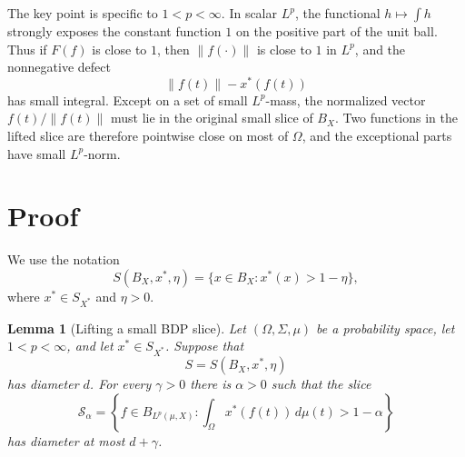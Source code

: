 \documentclass[11pt]{article}
\newtheorem{lemma}{Lemma}
\begin{document}
The key point is specific to \(1<p<\infty\).  In scalar \(L^p\), the functional \(h\mapsto\int h\) strongly exposes the constant function \(1\) on the positive part of the unit ball.  Thus if \(F(f)\) is close to \(1\), then \(\|f(\cdot)\|\) is close to \(1\) in \(L^p\), and the nonnegative defect
\[
  \|f(t)\|-x^*(f(t))
\]
has small integral.  Except on a set of small \(L^p\)-mass, the normalized vector \(f(t)/\|f(t)\|\) must lie in the original small slice of \(B_X\).  Two functions in the lifted slice are therefore pointwise close on most of \(\Omega\), and the exceptional parts have small \(L^p\)-norm.

\section{Proof}

We use the notation
\[
  S(B_X,x^*,\eta)=\{x\in B_X: x^*(x)>1-\eta\},
\]
where \(x^*\in S_{X^*}\) and \(\eta>0\).

\begin{lemma}[Lifting a small BDP slice]\label{lem:lift}
Let \((\Omega,\Sigma,\mu)\) be a probability space, let \(1<p<\infty\), and let \(x^*\in S_{X^*}\).  Suppose that
\[
  S=S(B_X,x^*,\eta)
\]
has diameter \(d\).  For every \(\gamma>0\) there is \(\alpha>0\) such that the slice
\[
  \mathcal S_\alpha
  =
  \left\{f\in B_{L^p(\mu,X)}:
  \int_\Omega x^*(f(t))\,d\mu(t)>1-\alpha\right\}
\]
has diameter at most \(d+\gamma\).
\end{lemma}
\end{document}
